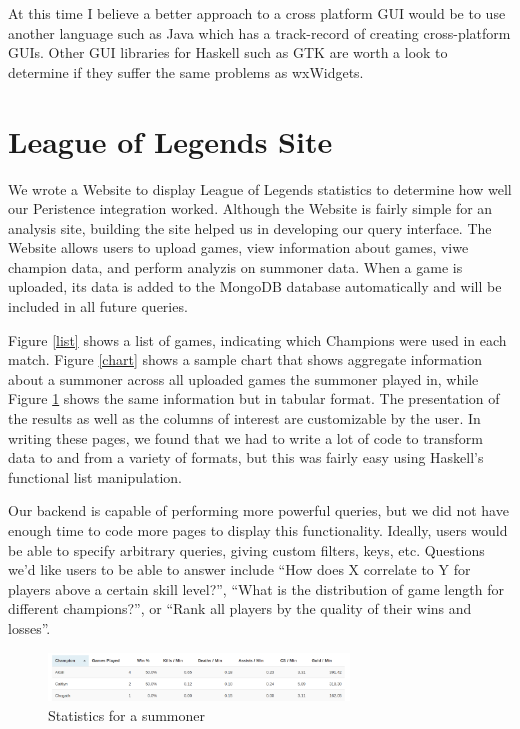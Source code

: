 \documentclass[letterpaper,twocolumn,9pt]{article}
\begin{document}
At this time I believe a better approach to a cross platform GUI would be to use another language such as Java which has a track-record of creating cross-platform GUIs. Other GUI libraries for Haskell such as GTK are worth a look to determine if they suffer the same problems as wxWidgets.

\section{League of Legends Site}
\label{site}

We wrote a Website to display League of Legends statistics to determine how well our Peristence integration worked. Although the Website is fairly simple for an analysis site, building the site helped us in developing our query interface. The Website allows users to upload games, view information about games, viwe champion data, and perform analyzis on summoner data. When a game is uploaded, its data is added to the MongoDB database automatically and will be included in all future queries.

Figure \ref{list} shows a list of games, indicating which Champions were used in each match. Figure \ref{chart} shows a sample chart that shows aggregate information about a summoner across all uploaded games the summoner played in, while Figure \ref{stats} shows the same information but in tabular format. The presentation of the results as well as the columns of interest are customizable by the user. In writing these pages, we found that we had to write a lot of code to transform data to and from a variety of formats, but this was fairly easy using Haskell's functional list manipulation. 

Our backend is capable of performing more powerful queries, but we did not have enough time to code more pages to display this functionality. Ideally, users would be able to specify arbitrary queries, giving custom filters, keys, etc. Questions we'd like users to be able to answer include ``How does X correlate to Y for players above a certain skill level?'', ``What is the distribution of game length for different champions?'', or ``Rank all players by the quality of their wins and losses''. 

\begin{figure}[h]
    \includegraphics[width=80mm]{imgs/stats.png}
    \caption{Statistics for a summoner}
    \label{stats}
\end{figure}
\end{document}
